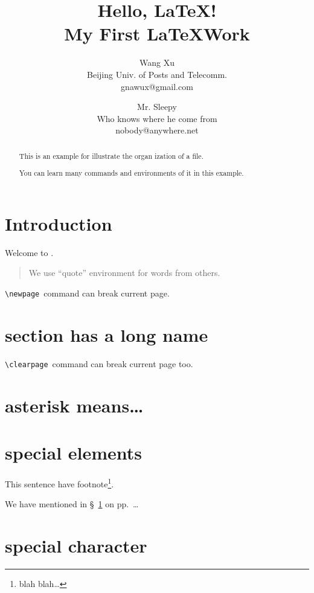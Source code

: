 \documentclass[a4paper,12pt]{article}
\begin{document}
\title{Hello, \LaTeX!\\
My First \LaTeX Work}
\author{Wang Xu\\
Beijing Univ. of Posts and Telecomm.\\
gnawux@gmail.com
\and 
Mr. Sleepy\\
Who knows where he come from\\
nobody@anywhere.net%
}
\maketitle

\begin{abstract}
This is an          example for illustrate the organ%
ization of 
a \LaTeXe file. 

You can learn many commands and environments of it in 
this example.
\end{abstract}

\section{Introduction}\label{sec:intro}

	Welcome to \LaTeXe.
	
\begin{quote}
We use ``quote'' environment for words from others.
\end{quote}
	
	\newpage
	\verb|\newpage|~command can break current page.

\section[short name]%
{section has a long name}

	\clearpage
	\verb|\clearpage|~command can break current page too.

\section*{asterisk means\ldots}

\section{special elements}

This sentence have 
footnote\footnote{blah blah\ldots}.

We have mentioned in \S~\ref{sec:intro} on 
pp.~\pageref{sec:intro}\ldots

\section{special character}
\end{document}

